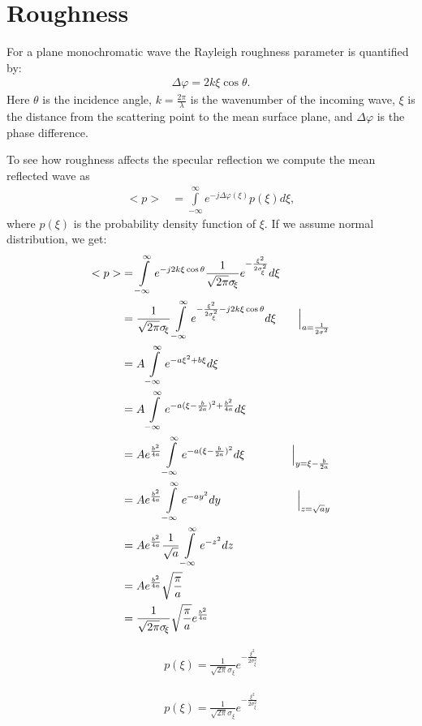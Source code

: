 
\newpage

\section{Roughness}

For a plane monochromatic wave the Rayleigh roughness parameter is quantified by:
\begin{align}
\Delta\varphi = 2k\xi\cos\theta.
\end{align}
Here $\theta$ is the incidence angle, $k = \frac{2\pi}{\lambda}$ is the wavenumber of the incoming wave, $\xi$ is the distance from the scattering point to the mean surface plane, and $\Delta\varphi$ is the phase difference.

\begin{figure}[th]
\end{figure}

To see how roughness affects the specular reflection we compute the mean reflected wave as
\begin{align}
<p> &= \int\limits_{-\infty}^{\infty} e^{-j\Delta\varphi(\xi)} p(\xi) d\xi,
\end{align}
where $p(\xi)$ is the probability density function of $\xi$. If we assume normal distribution, we get:
\begin{align}
<p> &= \int\limits_{-\infty}^{\infty} e^{-j2k\xi\cos\theta} \frac{1}{\sqrt{2\pi}\sigma_{\!\xi}}e^{-\frac{\xi^2}{2\sigma_{\!\xi}^2}} d\xi \nonumber\\
&= \frac{1}{\sqrt{2\pi}\sigma_{\!\xi}} \int\limits_{-\infty}^{\infty} e^{-\frac{\xi^2}{2\sigma_{\!\xi}^2}-j2k\xi\cos\theta} d\xi &\Big|_{a = \frac{1}{2\sigma^2}}\nonumber\\
&= A \int\limits_{-\infty}^{\infty} e^{-a\xi^2 + b\xi} d\xi \nonumber\\
&= A \int\limits_{-\infty}^{\infty} e^{-a(\xi - \frac{b}{2a})^2 + \frac{b^2}{4a}} d\xi \nonumber\\
&= A e^{\frac{b^2}{4a}} \int\limits_{-\infty}^{\infty} e^{-a(\xi - \frac{b}{2a})^2} d\xi & \Big|_{y = \xi - \frac{b}{2a}}\nonumber\\
&= A e^{\frac{b^2}{4a}} \int\limits_{-\infty}^{\infty} e^{-ay^2} dy & \Big|_{z = \sqrt{a} y}\nonumber\\
&= A e^{\frac{b^2}{4a}}\frac{1}{\sqrt{a}} \int\limits_{-\infty}^{\infty} e^{-z^2} dz \nonumber\\
&= A e^{\frac{b^2}{4a}}\sqrt{\frac{\pi}{a}} \nonumber\\
&= \frac{1}{\sqrt{2\pi}\sigma_{\!\xi}} \sqrt{\frac{\pi}{a}} e^{\frac{b^2}{4a}}
\end{align}


\begin{align}
p(\xi) = \frac{1}{\sqrt{2\pi}\sigma_{\!\xi}}e^{-\frac{\xi^2}{2\sigma_{\!\xi}^2}}
\end{align}


\begin{align}
p(\xi) = \frac{1}{\sqrt{2\pi}\sigma_{\!\xi}}e^{-\frac{\xi^2}{2\sigma_{\!\xi}^2}}
\end{align}

